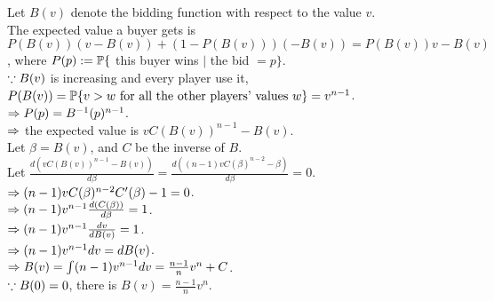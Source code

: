 \begin{pr}[21.11.13]
Let $B(v)$ denote the bidding function with respect to the value $v$.\\
The expected value a buyer gets is $P(B(v))(v-B(v))+(1-P(B(v)))(-B(v))=P(B(v))v-B(v)$, where $P(p):=\P\{$ this buyer wins $|$ the bid $=p\}$.\\
$\cuz B(v)$ is increasing and every player use it, $P(B(v))=\P\{v>w\text{ for all the other players' values }w\}=v^{n-1}$.\\
$\then P(p)=B^{-1}(p)^{n-1}$.\\
$\then$ the expected value is $vC(B(v))^{n-1}-B(v)$.\\
Let $\beta=B(v)$, and $C$ be the inverse of $B$.\\
Let $\frac{d(vC(B(v))^{n-1}-B(v))}{d\beta}=\frac{d((n-1)vC(\beta)^{n-2}-\beta)}{d\beta}=0$.\\
$\then(n-1)vC(\beta)^{n-2}C'(\beta)-1=0$.\\
$\then(n-1)v^{n-1}\frac{d(C(\beta))}{d\beta}=1$.\\
$\then(n-1)v^{n-1}\frac{dv}{dB(v)}=1$.\\
$\then(n-1)v^{n-1}dv=dB(v)$.\\
$\then B(v)=\int(n-1)v^{n-1}dv=\frac{n-1}nv^n+C$.\\
$\cuz B(0)=0$, there is $B(v)=\frac{n-1}nv^n$.
\end{pr}
